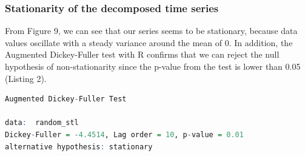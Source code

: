 \subsubsection{Stationarity of the decomposed time series}

From Figure 9, we can see that our series seems to be stationary, because data values oscillate with a steady variance around the mean of 0.
In addition, the Augmented Dickey-Fuller test with R confirms that we can reject the null hypothesis of non-stationarity since the p-value from the test is lower than 0.05 (Listing 2). \\

\begin{lstlisting}[language=R, caption=Final test of stationarity]
	Augmented Dickey-Fuller Test

data:  random_stl
Dickey-Fuller = -4.4514, Lag order = 10, p-value = 0.01
alternative hypothesis: stationary
\end{lstlisting}
